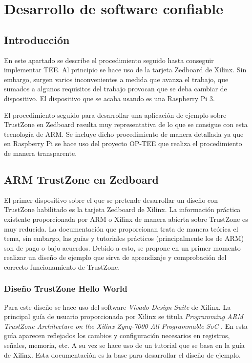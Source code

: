 \chapter{Desarrollo de software confiable}

\section{Introducción}
En este apartado se describe el procedimiento seguido hasta conseguir implementar TEE. Al principio se hace uso de la tarjeta Zedboard de Xilinx. Sin embargo, surgen varios inconvenientes a medida que avanza el trabajo, que sumados a algunos requisitos del trabajo provocan que se deba cambiar de dispositivo. El dispositivo que se acaba usando es una Raspberry Pi 3. \newline

El procedimiento seguido para desarrollar una aplicación de ejemplo sobre TrustZone en Zedboard resulta muy representativa de lo que se consigue con esta tecnología de ARM. Se incluye dicho procedimiento de manera detallada ya que en Raspberry Pi se hace uso del proyecto OP-TEE que realiza el procedimiento de manera transparente.

\section{ARM TrustZone en Zedboard}

El primer dispositivo sobre el que se pretende desarrollar un diseño con TrustZone habilitado es la tarjeta Zedboard de Xilinx. La información práctica existente proporcionada por ARM o Xilinx de manera abierta sobre TrustZone es muy reducida. La documentación que proporcionan trata de manera teórica el tema, sin embargo, las guías y tutoriales prácticos (principalmente los de ARM) son de pago o bajo acuerdos. Debido a esto, se propone en un primer momento realizar un diseño de ejemplo que sirva de aprendizaje y comprobación del correcto funcionamiento de TrustZone.

\subsection{Diseño TrustZone Hello World}
Para este diseño se hace uso del software \textit{Vivado Design Suite} de Xilinx. La principal guía de usuario proporcionada por Xilinx se titula \textit{Programming ARM TrustZone Architecture on the Xilinx Zynq-7000 All Programmable SoC} \cite{guiaxilinx}. En esta guía aparecen reflejados los cambios y configuración necesarios en registros, señales, memoria, etc. A su vez se hace uso de un tutorial \cite{vivadotutorial} que se basa en la guía de Xilinx. Esta documentación es la base para desarrollar el diseño de ejemplo.\newline

